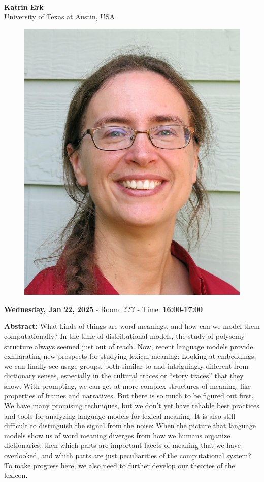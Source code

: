 \leavevmode\newline \leavevmode\newline
{\centering
{}\\  \vspace*{-0.1cm} \leavevmode\newline
{\normalsize \textbf{Katrin Erk}}\\
{\normalsize {University of Texas at Austin, USA}}\\


\begin{figure}[h!]
  \centering
      \includegraphics[width=0.15\linewidth]{examples/handbook_coling25/invited_talks/katrin_erk_invited_2.png}
\end{figure}

 {\normalsize \textbf{Wednesday, Jan 22, 2025} -
 Room: \textbf{???} -
 Time: \textbf{16:00-17:00}\\\leavevmode\newline
 }
}

{\textbf{Abstract:}}
What kinds of things are word meanings, and how can we model them computationally? In the time of distributional models, the study of polysemy structure always seemed just out of reach. Now, recent language models provide exhilarating new prospects for studying lexical meaning: Looking at embeddings, we can finally see usage groups, both similar to and intriguingly different from dictionary senses, especially in the cultural traces or “story traces” that they show. With prompting, we can get at more complex structures of meaning, like properties of frames and narratives. But there is so much to be figured out first. We have many promising techniques, but we don’t yet have reliable best practices and tools for analyzing language models for lexical meaning. It is also still difficult to distinguish the signal from the noise: When the picture that language models show us of word meaning diverges from how we humans organize dictionaries, then which parts are important facets of meaning that we have overlooked, and which parts are just peculiarities of the computational system? To make progress here, we also need to further develop our theories of the lexicon.\\

